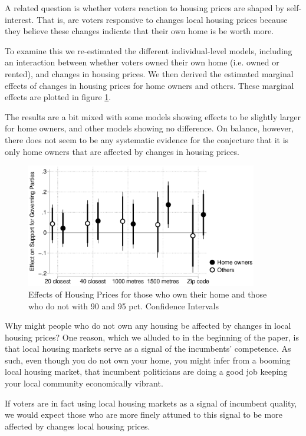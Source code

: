\documentclass[12pt,a4paper]{article}
\begin{document}
A related question is whether voters reaction to housing prices are shaped by self-interest. That is, are voters responsive to changes local housing prices because they believe these changes indicate that their own home is be worth more. 

To examine this we re-estimated the different individual-level models, including an interaction between whether voters owned their own home (i.e. owned or rented), and changes in housing prices. We then derived the estimated marginal effects of changes in housing prices for home owners and others. These marginal effects are plotted in figure \ref{homeown}.

The results are a bit mixed with some models showing effects to be slightly larger for home owners, and other models showing no difference. On balance, however, there does not seem to be any systematic evidence for the conjecture that it is only home owners that are affected by changes in housing prices.

\begin{figure}[htbp!]
	\includegraphics[width=0.9\textwidth]{../figures/homeown.eps}
	\centering
	\caption{Effects of Housing Prices for those who own their home and those who do not with 90  and 95 pct. Confidence Intervals}\label{homeown}
\end{figure}

Why might people who do not own any housing be affected by changes in local housing prices? One reason, which we alluded to in the beginning of the paper, is that local housing markets serve as a signal of the incumbents' competence. As such, even though you do not own your home, you might infer from a booming local housing market, that incumbent politicians are doing a good job keeping your local community economically vibrant.

If voters are in fact using local housing markets as a signal of incumbent quality, we would expect those who are more finely attuned to this signal to be more affected by changes local housing prices.
\end{document}
